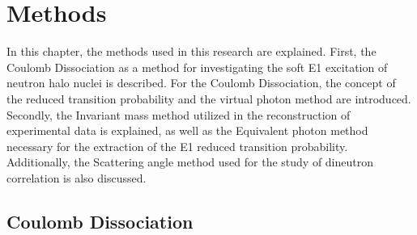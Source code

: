 \chapter{Methods}
In this chapter, the methods used in this research are explained. First, the Coulomb Dissociation as a method for investigating the soft E1 excitation of neutron halo nuclei is described. For the Coulomb Dissociation, the concept of the reduced transition probability and the virtual photon method are introduced.
Secondly, the Invariant mass method utilized in the reconstruction of experimental data is explained, as well as the Equivalent photon method necessary for the extraction of the E1 reduced transition probability. 
Additionally, the Scattering angle method used for the study of dineutron correlation is also discussed.

\section{Coulomb Dissociation}
